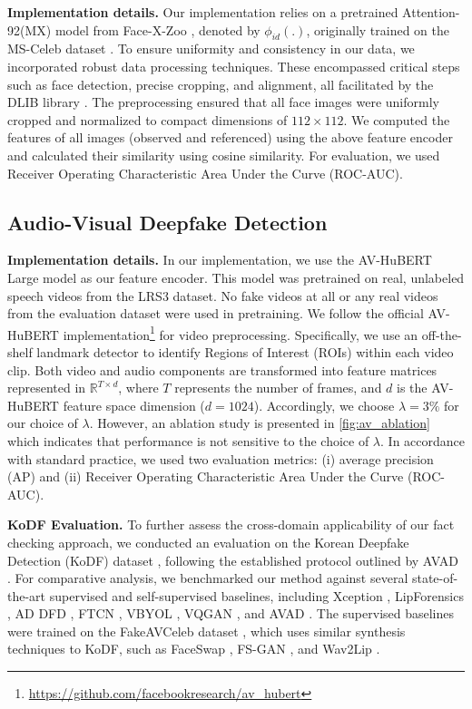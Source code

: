 \documentclass{article} \usepackage{iclr2024_conference,times}
\begin{document}
\textbf{Implementation details.} Our implementation relies on a pretrained Attention-92(MX) model from Face-X-Zoo \citep{facex}, denoted by $\phi_{id}(.)$, originally trained on the MS-Celeb dataset \citep{ms_celeb}. To ensure uniformity and consistency in our data, we incorporated robust data processing techniques. These encompassed critical steps such as face detection, precise cropping, and alignment, all facilitated by the DLIB library \citep{dlib}. The preprocessing ensured that all face images were uniformly cropped and normalized to compact dimensions of $112 \times 112$. We computed the features of all images (observed and referenced) using the above feature encoder and calculated their similarity using cosine similarity. For evaluation, we used Receiver Operating Characteristic Area Under the Curve (ROC-AUC).

\subsection{Audio-Visual Deepfake Detection}
\label{app:av}

\textbf{Implementation details.}
In our implementation, we use the AV-HuBERT Large model as our feature encoder. This model was pretrained on real, unlabeled speech videos from the LRS3 dataset. No fake videos at all or any real videos from the evaluation dataset were used in pretraining. We follow the official AV-HuBERT implementation\footnote{\url{https://github.com/facebookresearch/av_hubert}} for video preprocessing. Specifically, we use an off-the-shelf landmark detector to identify Regions of Interest (ROIs) within each video clip. Both video and audio components are transformed into feature matrices represented in $\mathbb{R}^{T \times d}$, where $T$ represents the number of frames, and $d$ is the AV-HuBERT feature space dimension ($d=1024$). Accordingly, we choose $\lambda = 3\%$ for our choice of $\lambda$. However, an ablation study is presented in \cref{fig:av_ablation} which indicates that performance is not sensitive to the choice of $\lambda$. In accordance with standard practice, we used two evaluation metrics: (i) average precision (AP) and (ii) Receiver Operating Characteristic Area Under the Curve (ROC-AUC). 

\textbf{KoDF Evaluation.} To further assess the cross-domain applicability of our fact checking approach, we conducted an evaluation on the Korean Deepfake Detection (KoDF) dataset \citep{kodf}, following the established protocol outlined by AVAD \citep{owens}. For comparative analysis, we benchmarked our method against several state-of-the-art supervised and self-supervised baselines, including Xception \citep{learning3_ff++}, LipForensics \citep{lip_forensics}, AD DFD \citep{AD_DFD}, FTCN \citep{ftcn}, VBYOL \citep{byol,real_forensics}, VQGAN \citep{vqgan}, and AVAD \citep{owens}. The supervised baselines were trained on the FakeAVCeleb dataset \citep{fakeavceleb}, which uses similar synthesis techniques to KoDF, such as FaceSwap \citep{faceswap}, FS-GAN \citep{faceswap4}, and Wav2Lip \citep{wav2lip}.
\end{document}
